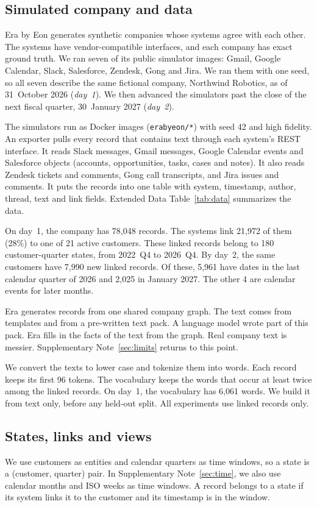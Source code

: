 \documentclass[11pt]{article}
\begin{document}
\subsection{Simulated company and data}
Era by Eon generates synthetic companies whose systems agree with each other. The systems have vendor-compatible interfaces, and each company has exact ground truth\citep{eon2026era,gruenbaum2026era}. We ran seven of its public simulator images: Gmail, Google Calendar, Slack, Salesforce, Zendesk, Gong and Jira. We ran them with one seed, so all seven describe the same fictional company, Northwind Robotics, as of 31~October 2026 (\emph{day~1}). We then advanced the simulators past the close of the next fiscal quarter, 30~January 2027 (\emph{day~2}).

The simulators run as Docker images (\texttt{erabyeon/*}) with seed 42 and high fidelity. An exporter pulls every record that contains text through each system's REST interface. It reads Slack messages, Gmail messages, Google Calendar events and Salesforce objects (accounts, opportunities, tasks, cases and notes). It also reads Zendesk tickets and comments, Gong call transcripts, and Jira issues and comments. It puts the records into one table with system, timestamp, author, thread, text and link fields. Extended Data Table~\ref{tab:data} summarizes the data.

On day~1, the company has 78{,}048 records. The systems link 21{,}972 of them (28\%) to one of 21 active customers. These linked records belong to 180 customer-quarter states, from 2022~Q4 to 2026~Q4. By day~2, the same customers have 7{,}990 new linked records. Of these, 5{,}961 have dates in the last calendar quarter of 2026 and 2{,}025 in January 2027. The other 4 are calendar events for later months.

Era generates records from one shared company graph. The text comes from templates and from a pre-written text pack. A language model wrote part of this pack. Era fills in the facts of the text from the graph\citep{eon2026era}. Real company text is messier. Supplementary Note~\ref{sec:limits} returns to this point.

We convert the texts to lower case and tokenize them into words. Each record keeps its first 96 tokens. The vocabulary keeps the words that occur at least twice among the linked records. On day~1, the vocabulary has 6{,}061 words. We build it from text only, before any held-out split. All experiments use linked records only.

\subsection{States, links and views}
We use customers as entities and calendar quarters as time windows, so a state is a (customer, quarter) pair. In Supplementary Note~\ref{sec:time}, we also use calendar months and ISO weeks as time windows. A record belongs to a state if its system links it to the customer and its timestamp is in the window.
\end{document}
